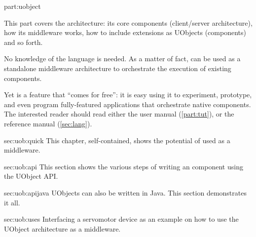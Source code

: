 
\begin{partDescription}{part:uobject}
  {
    This part covers the \urbi architecture: its core components
    (client/server architecture), how its middleware works, how to
    include extensions as UObjects (\Cxx components) and so forth.

    No knowledge of the \us language is needed.  As a matter of fact,
    \urbi can be used as a standalone middleware architecture to
    orchestrate the execution of existing components.

    Yet \us is a feature that ``comes for free'': it is easy using it
    to experiment, prototype, and even program fully-featured
    applications that orchestrate native components.  The interested
    reader should read either the \us user manual
    (\autoref{part:tut}), or the reference manual
    (\autoref{sec:lang}).
  }
\item[sec:uob:quick] This chapter, self-contained, shows the potential
  of \urbi used as a middleware.
\item[sec:uob:api] This section shows the various steps of writing an
  \urbi \Cxx component using the UObject API.
\item[sec:uob:apijava] UObjects can also be written in Java.  This section
  demonstrates it all.
\item[sec:uob:uses]
  Interfacing a servomotor device as an example on how to use the
  UObject architecture as a middleware.
\end{partDescription}

